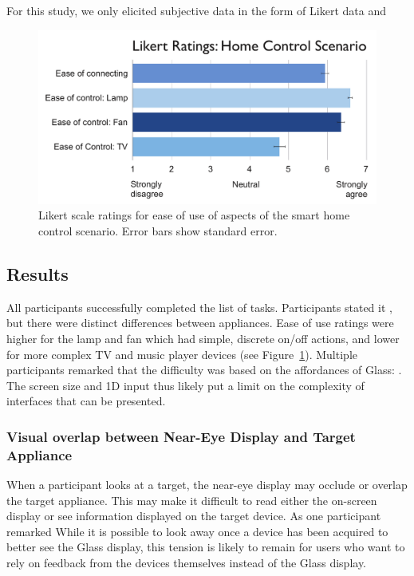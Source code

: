 For this study, we only elicited subjective data in the form of Likert data and 
\begin{figure}[b]
\centering
\includegraphics[width=1.0\columnwidth]{figures/scenario-likert.pdf}
\caption{Likert scale ratings for ease of use of aspects of the smart home control scenario. Error bars show standard error.}
\label{fig:smarthome-likert}
\end{figure}

\subsection{Results}
All participants successfully completed the list of tasks.
Participants stated it , but there were distinct differences between appliances. Ease of use ratings were higher for the lamp and fan which had simple, discrete on/off actions, and lower for more complex TV and music player devices (see Figure~\ref{fig:smarthome-likert}). Multiple participants remarked that the difficulty was based on the affordances of Glass: . The screen size and 1D input thus likely put a limit on the complexity of interfaces that can be presented.

\subsubsection{Visual overlap between Near-Eye Display and Target Appliance}
When a participant looks at a target, the near-eye display may occlude or overlap the target appliance. This may make it difficult to read either the on-screen display or see information displayed on the target device.  As one participant remarked  While it is possible to look away once a device has been acquired to better see the Glass display, this tension is likely to remain for users who want to rely on feedback from the devices themselves instead of the Glass display.

